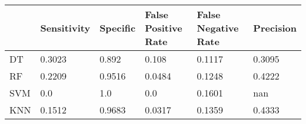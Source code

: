 \begin{table}[!h]
\begin{tabular}{l | l | l| l| l | l}
 & Sensitivity & Specific & False Positive Rate & False Negative Rate & Precision \\\hline
DT & 0.3023 & 0.892 & 0.108 & 0.1117 & 0.3095\\
RF & 0.2209 & 0.9516 & 0.0484 & 0.1248 & 0.4222\\
SVM & 0.0 & 1.0 & 0.0 & 0.1601 & nan\\
KNN & 0.1512 & 0.9683 & 0.0317 & 0.1359 & 0.4333\\
\end{tabular}
\caption{}
\end{table}
